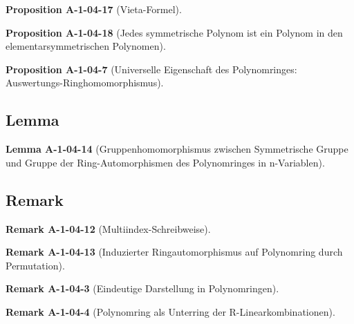 \documentclass[10pt, letterpaper]{article}
\newcommand{\CustomHeading}[3]{%
  \par\medskip\noindent%
  \textbf{#1 #2} \textnormal{(#3)}.\enskip%
}
\newenvironment{PROP}[2]{\CustomHeading{Proposition}{#1}{#2}}{}
\newenvironment{LEM}[2]{\CustomHeading{Lemma}{#1}{#2}}{}
\newenvironment{REM}[2]{\CustomHeading{Remark}{#1}{#2}}{}
\begin{document}
\begin{PROP}{A-1-04-17}{Vieta-Formel}

\end{PROP}

\begin{PROP}{A-1-04-18}{Jedes symmetrische Polynom ist ein Polynom in den elementarsymmetrischen Polynomen}

\end{PROP}

\begin{PROP}{A-1-04-7}{Universelle Eigenschaft des Polynomringes: Auswertungs-Ringhomomorphismus}

\end{PROP}





\subsection{Lemma}

\begin{LEM}{A-1-04-14}{Gruppenhomomorphismus zwischen Symmetrische Gruppe und Gruppe der Ring-Automorphismen des Polynomringes in n-Variablen}

\end{LEM}



\subsection{Remark}



\begin{REM}{A-1-04-12}{Multiindex-Schreibweise}

\end{REM}

\begin{REM}{A-1-04-13}{Induzierter Ringautomorphismus auf Polynomring durch Permutation}

\end{REM}

\begin{REM}{A-1-04-3}{Eindeutige Darstellung in Polynomringen}

\end{REM}

\begin{REM}{A-1-04-4}{Polynomring als Unterring der R-Linearkombinationen}

\end{REM}
\end{document}
